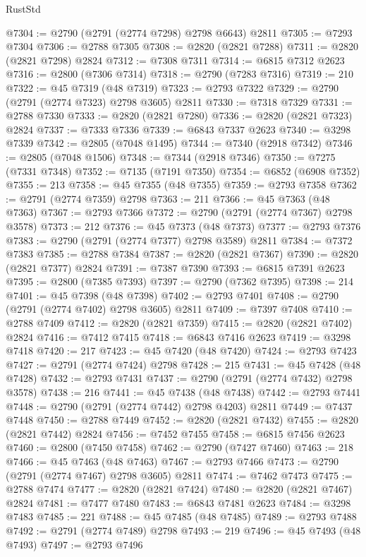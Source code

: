 \begin{lexlean}{RustStd}
\begin{coremodule}
@7304 := @2790 (@2791 (@2774 @7298) @2798 @6643) @2811
@7305 := @7293 @7304
@7306 := @2788 @7305
@7308 := @2820 (@2821 @7288)
@7311 := @2820 (@2821 @7298) @2824
@7312 := @7308 @7311
@7314 := @6815 @7312 @2623
@7316 := @2800 (@7306 @7314)
@7318 := @2790 (@7283 @7316)
@7319 := 210
@7322 := @45 @7319 (@48 @7319)
@7323 := @2793 @7322
@7329 := @2790 (@2791 (@2774 @7323) @2798 @3605) @2811
@7330 := @7318 @7329
@7331 := @2788 @7330
@7333 := @2820 (@2821 @7280)
@7336 := @2820 (@2821 @7323) @2824
@7337 := @7333 @7336
@7339 := @6843 @7337 @2623
@7340 := @3298 @7339
@7342 := @2805 (@7048 @1495)
@7344 := @7340 (@2918 @7342)
@7346 := @2805 (@7048 @1506)
@7348 := @7344 (@2918 @7346)
@7350 := @7275 (@7331 @7348)
@7352 := @7135 (@7191 @7350)
@7354 := @6852 (@6908 @7352)
@7355 := 213
@7358 := @45 @7355 (@48 @7355)
@7359 := @2793 @7358
@7362 := @2791 (@2774 @7359) @2798
@7363 := 211
@7366 := @45 @7363 (@48 @7363)
@7367 := @2793 @7366
@7372 := @2790 (@2791 (@2774 @7367) @2798 @3578)
@7373 := 212
@7376 := @45 @7373 (@48 @7373)
@7377 := @2793 @7376
@7383 := @2790 (@2791 (@2774 @7377) @2798 @3589) @2811
@7384 := @7372 @7383
@7385 := @2788 @7384
@7387 := @2820 (@2821 @7367)
@7390 := @2820 (@2821 @7377) @2824
@7391 := @7387 @7390
@7393 := @6815 @7391 @2623
@7395 := @2800 (@7385 @7393)
@7397 := @2790 (@7362 @7395)
@7398 := 214
@7401 := @45 @7398 (@48 @7398)
@7402 := @2793 @7401
@7408 := @2790 (@2791 (@2774 @7402) @2798 @3605) @2811
@7409 := @7397 @7408
@7410 := @2788 @7409
@7412 := @2820 (@2821 @7359)
@7415 := @2820 (@2821 @7402) @2824
@7416 := @7412 @7415
@7418 := @6843 @7416 @2623
@7419 := @3298 @7418
@7420 := 217
@7423 := @45 @7420 (@48 @7420)
@7424 := @2793 @7423
@7427 := @2791 (@2774 @7424) @2798
@7428 := 215
@7431 := @45 @7428 (@48 @7428)
@7432 := @2793 @7431
@7437 := @2790 (@2791 (@2774 @7432) @2798 @3578)
@7438 := 216
@7441 := @45 @7438 (@48 @7438)
@7442 := @2793 @7441
@7448 := @2790 (@2791 (@2774 @7442) @2798 @4203) @2811
@7449 := @7437 @7448
@7450 := @2788 @7449
@7452 := @2820 (@2821 @7432)
@7455 := @2820 (@2821 @7442) @2824
@7456 := @7452 @7455
@7458 := @6815 @7456 @2623
@7460 := @2800 (@7450 @7458)
@7462 := @2790 (@7427 @7460)
@7463 := 218
@7466 := @45 @7463 (@48 @7463)
@7467 := @2793 @7466
@7473 := @2790 (@2791 (@2774 @7467) @2798 @3605) @2811
@7474 := @7462 @7473
@7475 := @2788 @7474
@7477 := @2820 (@2821 @7424)
@7480 := @2820 (@2821 @7467) @2824
@7481 := @7477 @7480
@7483 := @6843 @7481 @2623
@7484 := @3298 @7483
@7485 := 221
@7488 := @45 @7485 (@48 @7485)
@7489 := @2793 @7488
@7492 := @2791 (@2774 @7489) @2798
@7493 := 219
@7496 := @45 @7493 (@48 @7493)
@7497 := @2793 @7496

\end{coremodule}
\end{lexlean}
